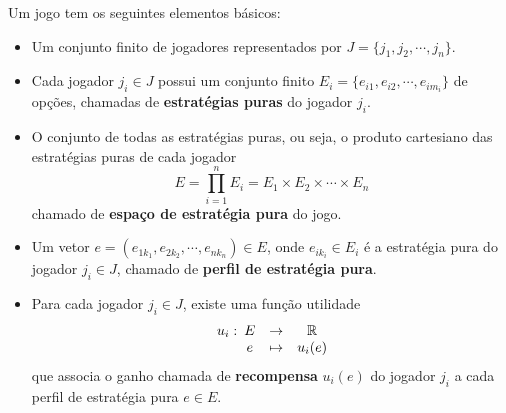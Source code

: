 Um jogo tem os seguintes elementos básicos:

\begin{itemize}
\item Um conjunto finito de jogadores representados por $J=\{j_1,j_2,\cdots,j_n\}$.
\item Cada jogador $j_i\in J$ possui um conjunto finito $E_i=\{e_{i1},e_{i2},\cdots,e_{im_i}\}$ de opções, chamadas de \textbf{estratégias puras} do jogador $j_i$.
\item O conjunto de todas as estratégias puras, ou seja, o produto cartesiano das estratégias puras de cada jogador $$E=\prod_{i=1}^{n}E_i=E_1\times E_2\times\cdots\times E_n$$ chamado de \textbf{espaço de estratégia pura} do jogo.
\item Um vetor $e=(e_{1k_1},e_{2k_2},\cdots,e_{nk_n})\in E$, onde $e_{ik_i}\in E_i$ é a estratégia pura do jogador $j_i\in J$, chamado de \textbf{perfil de estratégia pura}.
\item Para cada jogador $j_i\in J$, existe uma função utilidade $$\begin{array}{cccc} u_i:&\!\!\!E & \rightarrow & \mathbb{R} \\ &\!\!\! e & \mapsto & u_i(e) \end{array}$$ que associa o ganho chamada de \textbf{recompensa} $u_i(e)$ do jogador $j_i$ a cada perfil de estratégia pura $e\in E$.
\end{itemize}

